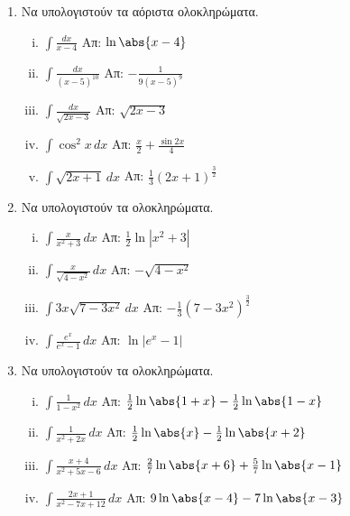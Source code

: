


\everymath{\displaystyle}
\pagestyle{askhseis}




\begin{center}
  \minibox{{\bfseries \large \textcolor{Col1}{Ασκήσεις στα Ολοκληρώματα}}}
\end{center}

\vspace{\baselineskip}


\begin{enumerate}
  \item Να υπολογιστούν τα αόριστα ολοκληρώματα.
    \begin{enumerate}[i)]
      \item $ \int \frac{dx}{x-4}$ \hfill Απ: $ \ln{\abs{x-4}} $ 
      \item $\int\frac{dx}{(x-5)^{10}} $ \hfill Απ: $-\frac{1}{9(x-5)^9}$
      \item $ \int\frac{dx}{\sqrt{2x-3}}$ \hfill Απ: $ \sqrt{2x-3} $
      \item $\int\cos^2x \, dx$ \hfill Απ: $\frac{x}{2} + \frac{\sin2x}{4}$
      \item $ \int \sqrt{ 2x+1 } \,{dx} $ \hfill Απ: 
        $ \frac{ 1 }{ 3 } (2x+1)^{\frac{ 3 }{ 2 } } $
    \end{enumerate}

  \item Να υπολογιστούν τα ολοκληρώματα.
    \begin{enumerate}[i)]
      \item $\int\frac{x}{x^2+3} \, dx$ \hfill Απ: $\frac{1}{2}\ln|x^2+3|$
      \item $ \int \frac{x}{\sqrt{4-x^{2}}} \,{dx} $ \hfill Απ: $ - \sqrt{4-x^{2}} $ 
      \item $ \int 3x \sqrt{ 7-3x^{2} } \,{dx} $ 
        \hfill Απ: $ - \frac{1}{ 3 } (7-3x^{2})^{\frac{ 3 }{ 2 }} $
      \item $\int \frac{e^x}{e^x-1} \, dx$ \hfill Απ: $\ln|e^x-1|$
    \end{enumerate}

  \item Να υπολογιστούν τα ολοκληρώματα.
    \begin{enumerate}[i)]
      \item $ \int \frac{1}{1-x^{2}} \,{dx} $ \hfill Απ: $ \frac{1}{2} \ln{\abs{1+x} - 
        \frac{1}{2} \ln{\abs{1-x}}} $
      \item $ \int \frac{1}{x^{2}+2x} \,{dx} $ \hfill Απ: $ \frac{1}{2} \ln{\abs{x}} -
        \frac{1}{2} \ln{\abs{x+2}} $ 
      \item $ \int \frac{x+4}{x^{2}+5x-6} \,{dx} $ \hfill Απ: $ \frac{2}{7}
        \ln{\abs{x+6}} + \frac{5}{7} \ln{\abs{x-1}} $
      \item $ \int \frac{2x+1}{x^{2}-7x+12} \,{dx} $ \hfill Απ: $ 9 \ln{\abs{x-4}} - 7
        \ln{\abs{x-3}} $ 
    \end{enumerate}


\end{enumerate}

